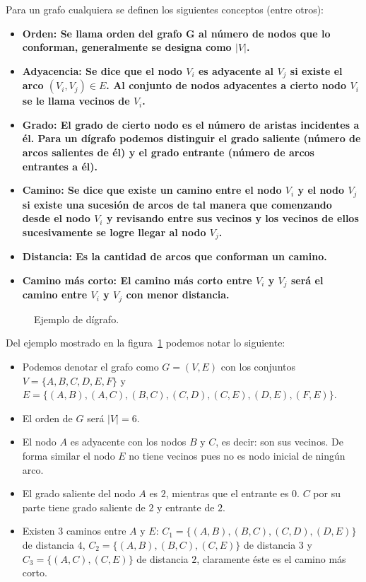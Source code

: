 Para un grafo cualquiera se definen los siguientes conceptos (entre otros):
\begin{itemize}
  \item \bf{Orden:}
    Se llama orden del grafo G al número de nodos que lo conforman, generalmente
    se designa como $|V|$.
  \item \bf{Adyacencia:}
    Se dice que el nodo $V_i$ es adyacente al $V_j$ si existe el arco 
    $(V_i, V_j) \in E$. Al conjunto de nodos adyacentes a cierto nodo $V_i$ se
    le llama \bf{vecinos} de $V_i$.
  \item \bf{Grado:}
    El grado de cierto nodo es el número de aristas incidentes a él. Para un
    dígrafo podemos distinguir el grado saliente (número de arcos salientes de
    él) y el grado entrante (número de arcos entrantes a él).
  \item \bf{Camino:}
    Se dice que existe un camino entre el nodo $V_i$ y el nodo $V_j$ si existe
    una sucesión de arcos de tal manera que comenzando desde el nodo $V_i$ y
    revisando entre sus vecinos y los vecinos de ellos sucesivamente se logre
    llegar al nodo $V_j$.
  \item \bf{Distancia:}
    Es la cantidad de arcos que conforman un camino.
  \item \bf{Camino más corto:}
    El camino más corto entre $V_i$ y $V_j$ será el camino entre $V_i$ y $V_j$
    con menor distancia.
\end{itemize}

\begin{figure}[htpb]
  \centering
  
  \caption{Ejemplo de dígrafo.}
  \label{fig:exgraph}
\end{figure}

Del ejemplo mostrado en la figura~\ref{fig:exgraph} podemos notar lo siguiente:
\begin{itemize}
  \item
    Podemos denotar el grafo como $G = (V,E)$ con los conjuntos 
    $V = \{A,B,C,D,E,F\}$ y 
    $E = \{(A,B),(A,C),(B,C),(C,D),(C,E),(D,E),(F,E)\}$.
  \item 
    El orden de $G$ será $|V| = 6$.
  \item
    El nodo $A$ es adyacente con los nodos $B$ y $C$, es decir: son sus vecinos.
    De forma similar el nodo $E$ no tiene vecinos pues no es nodo inicial de
    ningún arco.
  \item
    El grado saliente del nodo $A$ es $2$, mientras que el entrante es $0$.
    $C$ por su parte tiene grado saliente de $2$ y entrante de $2$.
  \item
    Existen 3 caminos entre $A$ y $E$: $C_1 = \{(A,B),(B,C),(C,D),(D,E)\}$ de
    distancia $4$, $C_2 = \{(A,B),(B,C),(C,E)\}$ de distancia $3$ y 
    $C_3 = \{(A,C),(C,E)\}$ de distancia $2$, claramente éste es el camino más
    corto.
\end{itemize}


